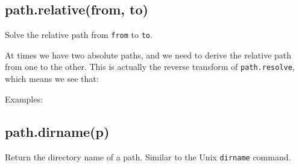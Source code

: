 \subsection{path.relative(from, to)}\label{path.relativefrom-to}

Solve the relative path from \texttt{from} to \texttt{to}.

At times we have two absolute paths, and we need to derive the relative
path from one to the other. This is actually the reverse transform of
\texttt{path.resolve}, which means we see that:

\begin{Shaded}
\begin{Highlighting}[]
\end{Highlighting}
\end{Shaded}

Examples:

\begin{Shaded}
\begin{Highlighting}[]
\NormalTok{(}\CharTok{\textbackslash{}\textbackslash{}}\CharTok{\textbackslash{}\textbackslash{}}\CharTok{\textbackslash{}\textbackslash{}}\NormalTok{, }\CharTok{\textbackslash{}\textbackslash{}}\CharTok{\textbackslash{}\textbackslash{}}\CharTok{\textbackslash{}\textbackslash{}}\NormalTok{)}
\CharTok{\textbackslash{}\textbackslash{}}\CharTok{\textbackslash{}\textbackslash{}}\CharTok{\textbackslash{}\textbackslash{}}

\NormalTok{(}\NormalTok{, }\NormalTok{)}
\end{Highlighting}
\end{Shaded}

\subsection{path.dirname(p)}\label{path.dirnamep}

Return the directory name of a path. Similar to the Unix
\texttt{dirname} command.

